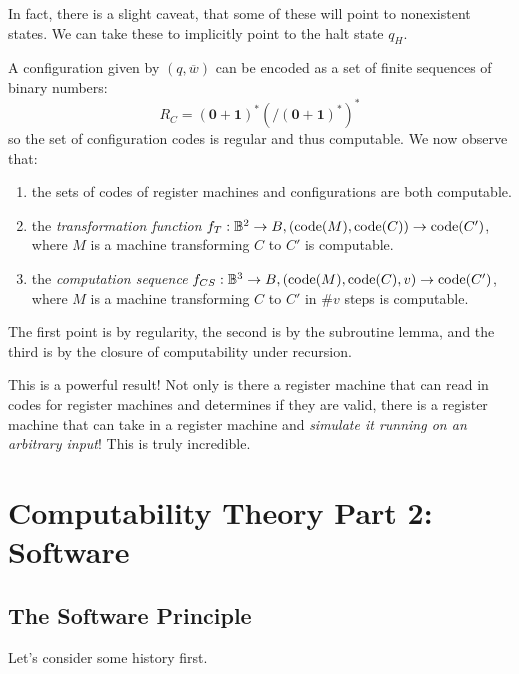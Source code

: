\documentclass{article}
\begin{document}
\begin{note}
	In fact, there is a slight caveat, that some of these will point to nonexistent states. We can take these to implicitly point to the halt state $q_H$.
\end{note}

A configuration given by $(q, \overline w)$ can be encoded as a set of finite sequences of binary numbers:
\[
	R_C = (\textbf{0} + \textbf{1})^* \left( / (\textbf{0} + \textbf{1})^* \right)^*
\]
so the set of configuration codes is regular and thus computable. We now observe that:
\begin{enumerate}
	\item the sets of codes of register machines and configurations are both computable.
	\item the \textit{transformation function} $f_T: \mathbb{B}^2 \to B, (\operatorname{code}(M), \operatorname{code}(C)) \to \operatorname{code}(C')$, where $M$ is a machine transforming $C$ to $C'$ is computable.
	\item the \textit{computation sequence} $f_{CS}: \mathbb{B}^3 \to B, (\operatorname{code}(M), \operatorname{code}(C), v) \to \operatorname{code}(C')$, where $M$ is a machine transforming $C$ to $C'$ in $\# v$ steps is computable.
\end{enumerate}
The first point is by regularity, the second is by the subroutine lemma, and the third is by the closure of computability under recursion.

This is a powerful result! Not only is there a register machine that can read in codes for register machines and determines if they are valid, there is a register machine that can take in a register machine and \textit{simulate it running on an arbitrary input}! This is truly incredible.

\pagebreak
\section{Computability Theory Part 2: Software}
\subsection{The Software Principle}

Let's consider some history first.
\end{document}
